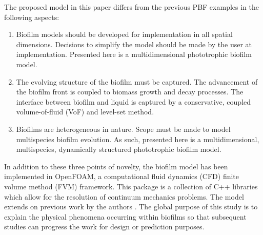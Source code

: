 The proposed model in this paper differs from the previous PBF examples in the following aspects:
\begin{enumerate}
\item Biofilm models should be developed for implementation in all spatial dimensions. Decisions to simplify the model should be made by the user at implementation. Presented here is a multidimensional phototrophic biofilm model.
\item The evolving structure of the biofilm must be captured. The advancement of the biofilm front is coupled to biomass growth and decay processes. The interface between biofilm and liquid is captured by a conservative, coupled volume-of-fluid (VoF) and level-set method.
\item Biofilms are heterogeneous in nature. Scope must be made to model multispecies biofilm evolution. As such, presented here is a multidimensional,  multispecies, dynamically structured phototrophic biofilm model.
\end{enumerate}

In addition to these three points of novelty, the biofilm model has been implemented in OpenFOAM, a computational fluid dynamics (CFD) finite volume method (FVM) framework. This package is a collection of C++ libraries which allow for the resolution of continuum mechanics problems. The model extends on previous work by the authors \cite{puyol2017}. The global purpose of this study is to explain the physical phenomena occurring within biofilms so that subsequent studies can progress the work for design or prediction purposes.
